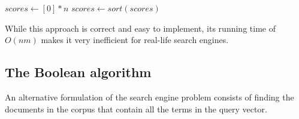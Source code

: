 \documentclass{report}
\begin{document}
\begin{algorithm}[H]
    \caption{The search engine problem as a nearest neighbours problem.}

    $scores \gets [0] * n$\;
    $scores \gets sort(scores)$\;
    \;
\end{algorithm}
\noindent While this approach is correct and easy to implement, its running time of $\displaystyle O(nm)$ makes it very inefficient for real-life search engines.
\subsection{The Boolean algorithm}
An alternative formulation of the search engine problem consists of finding the documents in the corpus that contain all the terms in the query vector.
\end{document}
